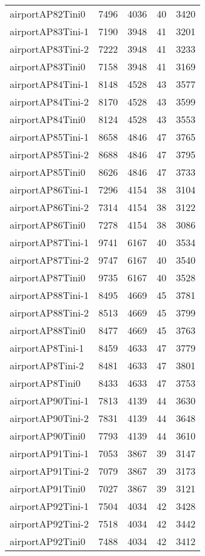 \begin{longtable}{lrrrr}
airportAP82Tini0 & 7496 & 4036 & 40 & 3420 \\
airportAP83Tini-1 & 7190 & 3948 & 41 & 3201 \\
airportAP83Tini-2 & 7222 & 3948 & 41 & 3233 \\
airportAP83Tini0 & 7158 & 3948 & 41 & 3169 \\
airportAP84Tini-1 & 8148 & 4528 & 43 & 3577 \\
airportAP84Tini-2 & 8170 & 4528 & 43 & 3599 \\
airportAP84Tini0 & 8124 & 4528 & 43 & 3553 \\
airportAP85Tini-1 & 8658 & 4846 & 47 & 3765 \\
airportAP85Tini-2 & 8688 & 4846 & 47 & 3795 \\
airportAP85Tini0 & 8626 & 4846 & 47 & 3733 \\
airportAP86Tini-1 & 7296 & 4154 & 38 & 3104 \\
airportAP86Tini-2 & 7314 & 4154 & 38 & 3122 \\
airportAP86Tini0 & 7278 & 4154 & 38 & 3086 \\
airportAP87Tini-1 & 9741 & 6167 & 40 & 3534 \\
airportAP87Tini-2 & 9747 & 6167 & 40 & 3540 \\
airportAP87Tini0 & 9735 & 6167 & 40 & 3528 \\
airportAP88Tini-1 & 8495 & 4669 & 45 & 3781 \\
airportAP88Tini-2 & 8513 & 4669 & 45 & 3799 \\
airportAP88Tini0 & 8477 & 4669 & 45 & 3763 \\
airportAP8Tini-1 & 8459 & 4633 & 47 & 3779 \\
airportAP8Tini-2 & 8481 & 4633 & 47 & 3801 \\
airportAP8Tini0 & 8433 & 4633 & 47 & 3753 \\
airportAP90Tini-1 & 7813 & 4139 & 44 & 3630 \\
airportAP90Tini-2 & 7831 & 4139 & 44 & 3648 \\
airportAP90Tini0 & 7793 & 4139 & 44 & 3610 \\
airportAP91Tini-1 & 7053 & 3867 & 39 & 3147 \\
airportAP91Tini-2 & 7079 & 3867 & 39 & 3173 \\
airportAP91Tini0 & 7027 & 3867 & 39 & 3121 \\
airportAP92Tini-1 & 7504 & 4034 & 42 & 3428 \\
airportAP92Tini-2 & 7518 & 4034 & 42 & 3442 \\
airportAP92Tini0 & 7488 & 4034 & 42 & 3412 \\

\end{longtable}
